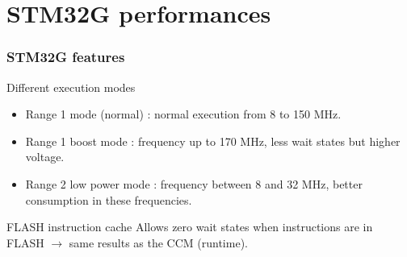 \documentclass[
	11pt, %
]{beamer}
\begin{document}
\section{STM32G performances}
\begin{frame}
	\frametitle{STM32G features}
	\begin{block}{Different execution modes}
		\begin{itemize}
			\item Range 1 mode (normal) : normal execution from 8 to 150 MHz.
			\item Range 1 boost mode : frequency up to 170 MHz, less wait states but higher voltage.
			\item Range 2 low power mode : frequency between 8 and 32 MHz, better consumption in these frequencies.
		\end{itemize}
	\end{block}
	\begin{block}{FLASH instruction cache}
		Allows zero wait states when instructions are in FLASH $\rightarrow$ same results as the CCM (runtime).
	\end{block}
\end{frame}
\end{document}
